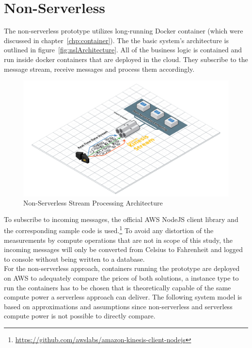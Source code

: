 \section{Non-Serverless}\label{chp:protoNSL}

The non-serverless prototype utilizes long-running Docker container (which were discussed in chapter~\vref{chp:container}). The the basic system's architecture is outlined in figure~\vref{fig:nslArchitecture}. All of the business logic is contained and run inside docker containers that are deployed in the cloud. They subscribe to the message stream, receive messages and process them accordingly. 

\begin{figure}[ht]
    \includegraphics[width=\linewidth]{images/streaming/containerArch.png}\centering
    \caption
    {Non-Serverless Stream Processing Architecture}
    \label{fig:nslArchitecture}
\end{figure}

To subscribe to incoming messages, the official AWS NodeJS client library and the corresponding sample code is used.\footnote{\url{https://github.com/awslabs/amazon-kinesis-client-nodejs}} To avoid any distortion of the measurements by compute operations that are not in scope of this study, the incoming messages will only be converted from Celsius to Fahrenheit and logged to console without being written to a database.\\
For the non-serverless approach, containers running the prototype are deployed on AWS to adequately compare the prices of both solutions, a instance type to run the containers has to be chosen that is theoretically capable of the same compute power a serverless approach can deliver. The following system model is based on approximations and assumptions since non-serverless and serverless compute power is not possible to directly compare.


